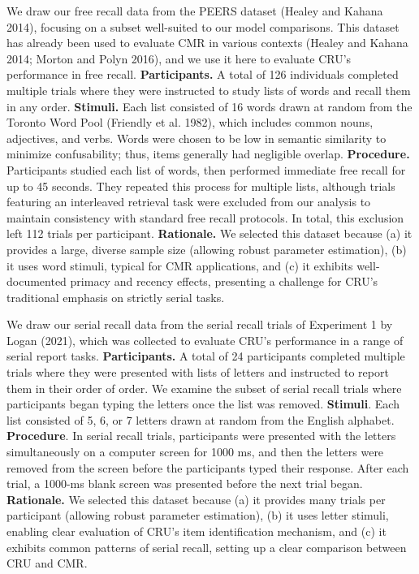 \documentclass[
  letterpaper,
  DIV=11,
  numbers=noendperiod]{scrartcl}
\begin{document}
We draw our free recall data from the PEERS dataset (Healey and Kahana
2014), focusing on a subset well-suited to our model comparisons. This
dataset has already been used to evaluate CMR in various contexts
(Healey and Kahana 2014; Morton and Polyn 2016), and we use it here to
evaluate CRU's performance in free recall. \textbf{Participants.} A
total of 126 individuals completed multiple trials where they were
instructed to study lists of words and recall them in any order.
\textbf{Stimuli.} Each list consisted of 16 words drawn at random from
the Toronto Word Pool (Friendly et al. 1982), which includes common
nouns, adjectives, and verbs. Words were chosen to be low in semantic
similarity to minimize confusability; thus, items generally had
negligible overlap. \textbf{Procedure.} Participants studied each list
of words, then performed immediate free recall for up to 45 seconds.
They repeated this process for multiple lists, although trials featuring
an interleaved retrieval task were excluded from our analysis to
maintain consistency with standard free recall protocols. In total, this
exclusion left 112 trials per participant. \textbf{Rationale.} We
selected this dataset because (a) it provides a large, diverse sample
size (allowing robust parameter estimation), (b) it uses word stimuli,
typical for CMR applications, and (c) it exhibits well-documented
primacy and recency effects, presenting a challenge for CRU's
traditional emphasis on strictly serial tasks.

We draw our serial recall data from the serial recall trials of
Experiment 1 by Logan (2021), which was collected to evaluate CRU's
performance in a range of serial report tasks. \textbf{Participants.} A
total of 24 participants completed multiple trials where they were
presented with lists of letters and instructed to report them in their
order of order. We examine the subset of serial recall trials where
participants began typing the letters once the list was removed.
\textbf{Stimuli}. Each list consisted of 5, 6, or 7 letters drawn at
random from the English alphabet. \textbf{Procedure}. In serial recall
trials, participants were presented with the letters simultaneously on a
computer screen for 1000 ms, and then the letters were removed from the
screen before the participants typed their response. After each trial, a
1000-ms blank screen was presented before the next trial began.
\textbf{Rationale.} We selected this dataset because (a) it provides
many trials per participant (allowing robust parameter estimation), (b)
it uses letter stimuli, enabling clear evaluation of CRU's item
identification mechanism, and (c) it exhibits common patterns of serial
recall, setting up a clear comparison between CRU and CMR.
\end{document}
